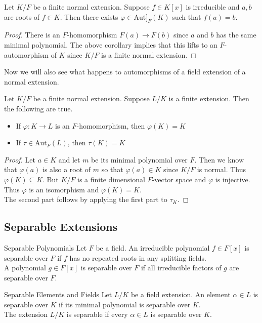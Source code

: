 \documentclass[a4paper]{article}
\begin{document}
\begin{crl}{}{} Let $K/F$ be a finite normal extension. Suppose $f\in K[x]$ is irreducible and $a,b$ are roots of $f\in K$. Then there exists $\varphi\in\text{Aut]}_F(K)$ such that $f(a)=b$. 
\begin{proof}
There is an $F$-homomorphism $F(a)\to F(b)$ since $a$ and $b$ has the same minimal polynomial. The above corollary implies that this lifts to an $F$-automorphism of $K$ since $K/F$ is a finite normal extension. 
\end{proof}
\end{crl}

Now we will also see what happens to automorphisms of a field extension of a normal extension. 

\begin{prp}{}{} Let $K/F$ be a finite normal extension. Suppose $L/K$ is a finite extension. Then the following are true. 
\begin{itemize}
\item If $\varphi:K\to L$ is an $F$-homomorphism, then $\varphi(K)=K$
\item If $\tau\in\text{Aut}_F(L)$, then $\tau(K)=K$
\end{itemize} 
\begin{proof}
Let $a\in K$ and let $m$ be its minimal polynomial over $F$. Then we know that $\varphi(a)$ is also a root of $m$ so that $\varphi(a)\in K$ since $K/F$ is normal. Thus $\varphi(K)\subseteq K$. But $K/F$ is a finite dimensional $F$-vector space and $\varphi$ is injective. Thus $\varphi$ is an isomorphism and $\varphi(K)=K$. \\

The second part follows by applying the first part to $\tau_K$. 
\end{proof}
\end{prp}

\subsection{Separable Extensions}
\begin{defn}{Separable Polynomials}{} Let $F$ be a field. An irreducible polynomial $f\in F[x]$ is separable over $F$ if $f$ has no repeated roots in any splitting fields. \\
A polynomial $g\in F[x]$ is separable over $F$ if all irreducible factors of $g$ are separable over $F$. 
\end{defn}

\begin{defn}{Separable Elements and Fields}{} Let $L/K$ be a field extension. An element $\alpha\in L$ is separable over $K$ if its minimal polynomial is separable over $K$. \\
The extension $L/K$ is separable if every $\alpha\in L$ is separable over $K$. 
\end{defn}
\end{document}
